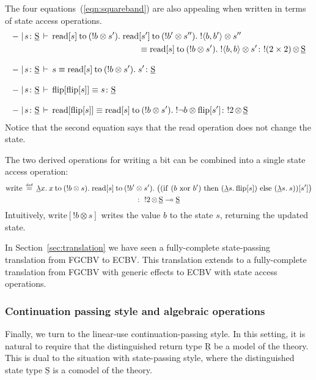 \documentclass{LMCS}
\newcommand{\EECstate}{\underline{\mathrm{S}}}
\newcommand{\EECret}{\comptype{\mathrm{R}}}
\newcommand{\svar}s
\newcommand{\comptype}[1]{\underline{#1}}
\newcommand{\linlambda}{\comptype{\lambda}}
\newcommand{\co}{\colon}
\newcommand{\tensor}{\otimes}
\newcommand{\ltensortype}[2]{{!} #1 \, {\tensor} \, #2}
\newcommand{\llambda}{\linlambda}
\newcommand{\llam}[3]{\llambda #1.\: #3}
\newcommand{\ltensorterm}[2]{{!  #1} \tensor #2}
\newcommand{\letdot}[4]{{#3}\:\mathrm{to}\:{(\ltensorterm{#1}{#2})}.\;#4}
\newcommand{\rIn}[2]{#1 \colon  #2}
\newcommand{\aeq}[5]{#1 \mid  \! #2 \, \vdash \, \rIn{#3\equiv #4}{#5}}
\newcommand{\pair}[2]{\langle #1 , #2 \rangle}
\newcommand{\gnl}{\\[2ex]} \newcommand{\gnlarray}{\\[4ex]}
\newcommand{\defeq}{\mathrel{\,\stackrel{\mbox{\tiny{$\mathrm{def}$}}}=\,}}
\begin{document}
The four equations~(\ref{eqn:squareband}) 
are also appealing when written in terms
of state access operations.
\begin{equation}\label{eqn:statestore}
\begin{aligned}
&\aeq{-}{\svar\co \EECstate}
{\letdot{b}{s'}{\sread[\svar]}{\letdot{b'}{s''}{\sread[s']}
{\ltensorterm{\pair b{b'}}{s''}}}\\&\hspace{5.2cm}}
{\letdot{b}{s'}{\sread[\svar]}{\ltensorterm{\pair bb}{s'}}}
{\ltensortype{(2\times 2)}\EECstate}
\gnl
&\aeq{-}{\svar\co\EECstate}
\svar
{\letdot b {s'}{\sread[s]}{s'}}
\EECstate
\gnl
&\aeq{-}{\svar\co\EECstate}
{\sflip[\sflip[\svar]]}
\svar
\EECstate
\gnl
&
\aeq{-}{\svar\co\EECstate}
{\sread[\sflip[\svar]]}
{\letdot b {s'}{\sread[s]}
\ltensorterm {\neg b}{\sflip[\svar']}}
{\ltensortype 2\EECstate}
\end{aligned}\end{equation}
Notice that the second equation says that the read operation does not change the state.

The two derived operations for writing a bit 
can be combined into a single state access operation:
\begin{multline*}
\mathrm{write}\defeq 
\llam x {}
{\letdot b s x 
{\letdot {b'}{s'}{\sread[s]}
{\big((\sif {(b\ \text{xor}\ b')}
{(\llam {s}{}{\sflip[s]})}
{(\llam {s}{S}{s})})
[s']\big)}}}
\\ :\ 
\ltensortype{2}\EECstate
\lpop \EECstate
\end{multline*}
Intuitively, $\mathrm{write}[\ltensorterm b s]$
writes the value $b$ to the state $s$,
 returning the updated state.

In Section~\ref{sec:translation}
we have seen a fully-complete state-passing translation 
from FGCBV to ECBV. 
This translation extends to a fully-complete translation
from FGCBV with generic effects to ECBV with state access operations.

\subsubsection{Continuation passing style and algebraic operations}
Finally, we turn to the linear-use continuation-passing style. 
In this setting, 
it is natural to require that 
the distinguished return type $\EECret$ be a model of the theory.
This is dual to the situation with state-passing style,
where the distinguished state type $\EECstate$ 
is a comodel of the theory.
\end{document}
